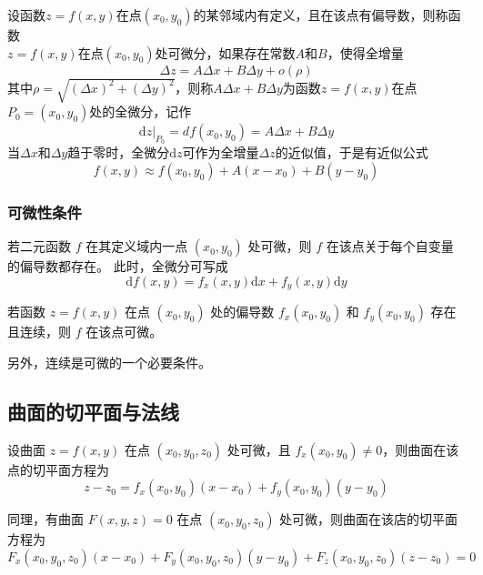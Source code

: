 \begin{definition}
    设函数$z=f(x,y)$在点$(x_0,y_0)$的某邻域内有定义，且在该点有偏导数，则称函数\\$z=f(x,y)$在点$(x_0,y_0)$处可微分，如果存在常数$A$和$B$，使得全增量
        \[
            \Delta z=A\Delta x+B\Delta y+o(\rho)
        \]
        其中$\rho=\sqrt{(\Delta x)^2+(\Delta y)^2}$，则称$A\Delta x+B\Delta y$为函数$z=f(x,y)$在点$P_0=(x_0,y_0)$处的全微分，记作
        \[
            \left.\mathrm{d}z\right|_{P_0}=df(x_0,y_0)=A\Delta x+B\Delta y
        \]
        当$\Delta x$和$\Delta y$趋于零时，全微分$\mathrm{d}z$可作为全增量$\Delta z$的近似值，于是有近似公式
    \[
        f(x,y)\approx f(x_0,y_0)+A(x-x_0)+B(y-y_0)
    \]
\end{definition}

\subsubsection{可微性条件}


\begin{theorem}
    若二元函数 $f$ 在其定义域内一点 $(x_0,y_0)$ 处可微，则 $f$ 在该点关于每个自变量的偏导数都存在。
    此时，全微分可写成
    \[
        \mathrm{d}f(x,y)=f_x(x,y)\mathrm{d}x+f_y(x,y)\mathrm{d}y
    \]
\end{theorem}

\begin{theorem}[可微的充分条件]
    若函数 $z=f(x,y)$ 在点 $(x_0,y_0)$ 处的偏导数 $f_x(x_0,y_0)$ 和 $f_y(x_0,y_0)$ 存在且连续，则 $f$ 在该点可微。
\end{theorem}

另外，连续是可微的一个必要条件。

\subsection{曲面的切平面与法线}

\begin{definition}
    设曲面 $z=f(x,y)$ 在点 $(x_0,y_0,z_0)$ 处可微，且 $f_x(x_0,y_0)\neq 0$，则曲面在该点的切平面方程为
    \[
        z-z_0=f_x(x_0,y_0)(x-x_0)+f_y(x_0,y_0)(y-y_0)
    \]
\end{definition}

同理，有曲面 $F(x,y,z)=0$ 在点 $(x_0,y_0,z_0)$ 处可微，则曲面在该店的切平面方程为
\[
    F_x(x_0,y_0,z_0)(x-x_0)+F_y(x_0,y_0,z_0)(y-y_0)+F_z(x_0,y_0,z_0)(z-z_0)=0
\]

